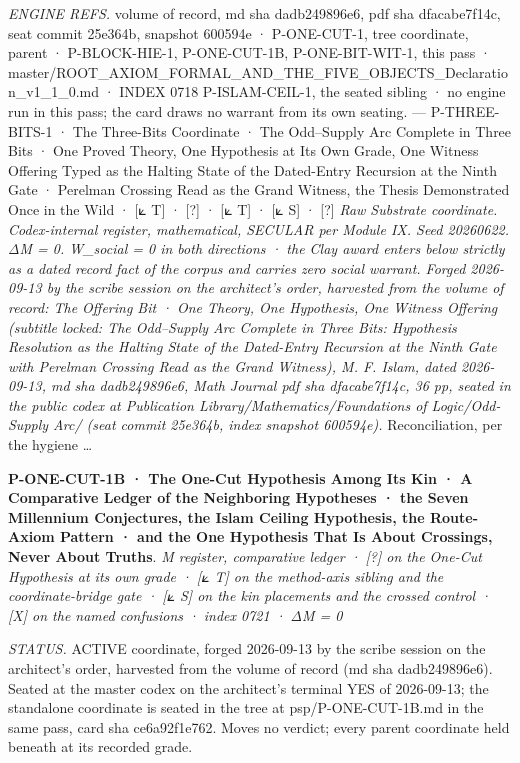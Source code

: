 \documentclass[10pt,twocolumn]{article}
\begin{document}
\emph{ENGINE REFS.} volume of record, md sha dadb249896e6, pdf sha
dfacabe7f14c, seat commit 25e364b, snapshot 600594e · P-ONE-CUT-1, tree
coordinate, parent · P-BLOCK-HIE-1, P-ONE-CUT-1B, P-ONE-BIT-WIT-1, this
pass ·
master/ROOT\_AXIOM\_FORMAL\_AND\_THE\_FIVE\_OBJECTS\_Declaration\_v1\_1\_0.md
· INDEX 0718 P-ISLAM-CEIL-1, the seated sibling · no engine run in this
pass; the card draws no warrant from its own seating. --- P-THREE-BITS-1
· The Three-Bits Coordinate · The Odd--Supply Arc Complete in Three Bits
· One Proved Theory, One Hypothesis at Its Own Grade, One Witness
Offering Typed as the Halting State of the Dated-Entry Recursion at the
Ninth Gate · Perelman Crossing Read as the Grand Witness, the Thesis
Demonstrated Once in the Wild · {[}⟀ T{]} · {[}?{]} · {[}⟀ T{]} · {[}⟀
S{]} · {[}?{]} \emph{Raw Substrate coordinate. Codex-internal register,
mathematical, SECULAR per Module IX. Seed 20260622. ΔM = 0. W\_social =
0 in both directions · the Clay award enters below strictly as a dated
record fact of the corpus and carries zero social warrant. Forged
2026-09-13 by the scribe session on the architect's order, harvested
from the volume of record: The Offering Bit · One Theory, One
Hypothesis, One Witness Offering (subtitle locked: The Odd--Supply Arc
Complete in Three Bits: Hypothesis Resolution as the Halting State of
the Dated-Entry Recursion at the Ninth Gate with Perelman Crossing Read
as the Grand Witness), M. F. Islam, dated 2026-09-13, md sha
dadb249896e6, Math Journal pdf sha dfacabe7f14c, 36 pp, seated in the
public codex at Publication Library/Mathematics/Foundations of
Logic/Odd-Supply Arc/ (seat commit 25e364b, index snapshot 600594e).}
Reconciliation, per the hygiene \ldots{}

\textbf{P-ONE-CUT-1B · The One-Cut Hypothesis Among Its Kin · A
Comparative Ledger of the Neighboring Hypotheses · the Seven Millennium
Conjectures, the Islam Ceiling Hypothesis, the Route-Axiom Pattern · and
the One Hypothesis That Is About Crossings, Never About Truths}. \emph{M
register, comparative ledger · {[}?{]} on the One-Cut Hypothesis at its
own grade · {[}⟀ T{]} on the method-axis sibling and the
coordinate-bridge gate · {[}⟀ S{]} on the kin placements and the crossed
control · {[}X{]} on the named confusions · index 0721 · ΔM = 0}

\emph{STATUS.} ACTIVE coordinate, forged 2026-09-13 by the scribe
session on the architect's order, harvested from the volume of record
(md sha dadb249896e6). Seated at the master codex on the architect's
terminal YES of 2026-09-13; the standalone coordinate is seated in the
tree at psp/P-ONE-CUT-1B.md in the same pass, card sha ce6a92f1e762.
Moves no verdict; every parent coordinate held beneath at its recorded
grade.
\end{document}
